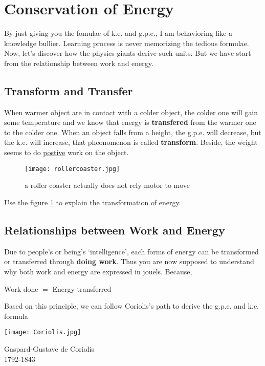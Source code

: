 \documentclass[a4paper]{tufte-handout}
\newenvironment{TaskBox} %
{\begin{tcolorbox}[breakable,colback=b1!30,colframe=b1,title=Task]} {\end{tcolorbox}}
\newenvironment{SummBox}
{\begin{tcolorbox}[breakable,colback=r1!30,colframe=r1,title=Summary]} {\end{tcolorbox}}
\begin{document}
\section{Conservation of Energy}
By just giving you the fomulae of k.e. and g.p.e., I am behavioring like a knowledge bullier. Learning process is never memorizing the tedious formulae. Now, let's discover how the physics giants derive such units. But we have start from the relationship between work and energy. 
\subsection{Transform and Transfer}
When warmer object are in contact with a colder object, the colder one will gain some temperature and we know that energy is \textbf{transfered} from the warmer one to the colder one.
When an object falls from a height, the g.p.e. will decrease, but the k.e. will increase, that pheonomenon is called \textbf{transform}. Beside, the weight seems to do \uline{postive} work on the object.
\begin{figure}[h]
\texttt{[image: rollercoaster.jpg]}
\caption{a roller coaster actually does not rely motor to move}
\label{fig:rollercoaster}
\end{figure}

\begin{TaskBox}
Use the figure \ref{fig:rollercoaster} to explain the transformation of energy.
\end{TaskBox}

\subsection{Relationships between Work and Energy}
Due to people's or being's `intelligence', each forms of energy can be transformed or transferred through \textbf{doing work}. Thus you are now supposed to understand why both work and energy are expressed in jouels. Because, 
\begin{SummBox}
\begin{center}
Work done $=$ Energy transferred
\end{center}
\end{SummBox}
Based on this principle, we can follow Coriolis's path to derive the g.p.e. and k.e. formula
\begin{marginfigure}
\texttt{[image: Coriolis.jpg]}
\caption{Gaspard-Gustave de Coriolis\\1792-1843}
\end{marginfigure}
\end{document}
